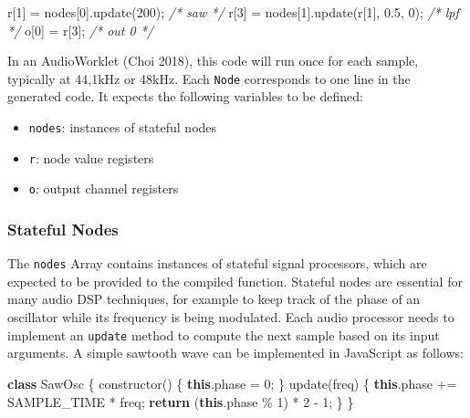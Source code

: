 \documentclass[11pt,]{article}
\newenvironment{Shaded}{}{}
\newcommand{\AttributeTok}[1]{\textcolor[rgb]{0.49,0.56,0.16}{#1}}
\newcommand{\CommentTok}[1]{\textcolor[rgb]{0.38,0.63,0.69}{\textit{#1}}}
\newcommand{\ControlFlowTok}[1]{\textcolor[rgb]{0.00,0.44,0.13}{\textbf{#1}}}
\newcommand{\DecValTok}[1]{\textcolor[rgb]{0.25,0.63,0.44}{#1}}
\newcommand{\FloatTok}[1]{\textcolor[rgb]{0.25,0.63,0.44}{#1}}
\newcommand{\FunctionTok}[1]{\textcolor[rgb]{0.02,0.16,0.49}{#1}}
\newcommand{\KeywordTok}[1]{\textcolor[rgb]{0.00,0.44,0.13}{\textbf{#1}}}
\newcommand{\NormalTok}[1]{#1}
\newcommand{\OperatorTok}[1]{\textcolor[rgb]{0.40,0.40,0.40}{#1}}
\providecommand{\tightlist}{%
  \setlength{\itemsep}{0pt}\setlength{\parskip}{0pt}}
\begin{document}
\begin{Shaded}
\begin{Highlighting}[]
\NormalTok{r[}\DecValTok{1}\NormalTok{] }\OperatorTok{=}\NormalTok{ nodes[}\DecValTok{0}\NormalTok{]}\OperatorTok{.}\FunctionTok{update}\NormalTok{(}\DecValTok{200}\NormalTok{)}\OperatorTok{;} \CommentTok{/* saw */}
\NormalTok{r[}\DecValTok{3}\NormalTok{] }\OperatorTok{=}\NormalTok{ nodes[}\DecValTok{1}\NormalTok{]}\OperatorTok{.}\FunctionTok{update}\NormalTok{(r[}\DecValTok{1}\NormalTok{]}\OperatorTok{,} \FloatTok{0.5}\OperatorTok{,} \DecValTok{0}\NormalTok{)}\OperatorTok{;} \CommentTok{/* lpf */}
\NormalTok{o[}\DecValTok{0}\NormalTok{] }\OperatorTok{=}\NormalTok{ r[}\DecValTok{3}\NormalTok{]}\OperatorTok{;} \CommentTok{/* out 0 */}
\end{Highlighting}
\end{Shaded}

In an AudioWorklet (Choi 2018), this code will run once for each sample,
typically at 44,1kHz or 48kHz. Each \texttt{Node} corresponds to one
line in the generated code. It expects the following variables to be
defined:

\begin{itemize}
\tightlist
\item
  \texttt{nodes}: instances of stateful nodes
\item
  \texttt{r}: node value registers
\item
  \texttt{o}: output channel registers
\end{itemize}

\subsubsection{Stateful Nodes}\label{stateful-nodes}

The \texttt{nodes} Array contains instances of stateful signal
processors, which are expected to be provided to the compiled function.
Stateful nodes are essential for many audio DSP techniques, for example
to keep track of the phase of an oscillator while its frequency is being
modulated. Each audio processor needs to implement an \texttt{update}
method to compute the next sample based on its input arguments. A simple
sawtooth wave can be implemented in JavaScript as follows:

\begin{Shaded}
\begin{Highlighting}[]
\KeywordTok{class}\NormalTok{ SawOsc \{}
  \FunctionTok{constructor}\NormalTok{() \{}
    \KeywordTok{this}\OperatorTok{.}\AttributeTok{phase} \OperatorTok{=} \DecValTok{0}\OperatorTok{;}
\NormalTok{  \}}
  \FunctionTok{update}\NormalTok{(freq) \{}
    \KeywordTok{this}\OperatorTok{.}\AttributeTok{phase} \OperatorTok{+=}\NormalTok{ SAMPLE\_TIME }\OperatorTok{*}\NormalTok{ freq}\OperatorTok{;}
    \ControlFlowTok{return}\NormalTok{ (}\KeywordTok{this}\OperatorTok{.}\AttributeTok{phase} \OperatorTok{\%} \DecValTok{1}\NormalTok{) }\OperatorTok{*} \DecValTok{2} \OperatorTok{{-}} \DecValTok{1}\OperatorTok{;}
\NormalTok{  \}}
\NormalTok{\}}
\end{Highlighting}
\end{Shaded}
\end{document}
